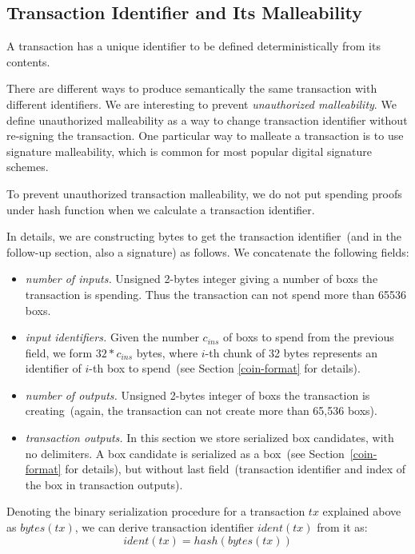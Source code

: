 \documentclass[]{article}   %
\newcommand{\coin}{box}
\begin{document}
\subsection{Transaction Identifier and Its Malleability}
\label{tx-identifier}

A transaction has a unique identifier to be defined deterministically from its contents.

There are different ways to produce semantically the same transaction with different identifiers. We are interesting
to prevent {\em unauthorized malleability}. We define unauthorized malleability as a way to change transaction
identifier without re-signing the transaction. One particular way to malleate a transaction is to use signature
malleability, which is common for most popular digital signature schemes.

To prevent unauthorized transaction malleability, we do not put spending proofs under hash function when we calculate a
transaction identifier.

In details, we are constructing bytes to get the transaction identifier~(and in the follow-up section, also a signature)
as follows. We concatenate the following fields:

\begin{itemize}
    \item{\em number of inputs.} Unsigned 2-bytes integer giving a number of \coin{}s the transaction is spending. Thus
    the transaction can not spend more than 65536 \coin{}s.
    \item{\em input identifiers.} Given the number $c_{ins}$ of \coin{}s to spend from the previous field, we form
    $32 * c_{ins}$ bytes, where $i$-th chunk of 32 bytes represents an identifier of $i$-th \coin{} to spend~(see Section
    \ref{coin-format} for details).
    \item{\em number of outputs.} Unsigned 2-bytes integer of \coin{}s the transaction is creating~(again, the
    transaction can not create more than 65,536 \coin{}s).
    \item{\em transaction outputs.} In this section we store serialized \coin{} candidates, with no delimiters. A \coin{}
    candidate is serialized as a \coin{}~(see Section~\ref{coin-format} for details), but without last field~(transaction
    identifier and index of the \coin{} in transaction outputs).
\end{itemize}

Denoting the binary serialization procedure for a transaction $tx$ explained above as $bytes(tx)$, we can derive
transaction identifier $ident(tx)$ from it as:
    $$ident(tx) = hash(bytes(tx))$$
\end{document}
